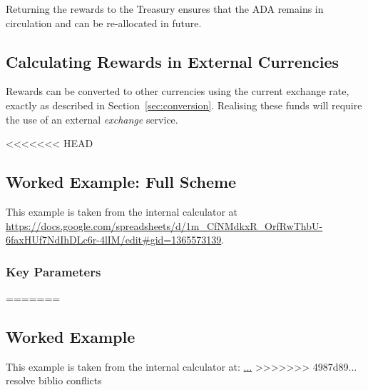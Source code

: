 \documentclass[11pt,a4paper,dvipsnames,twosided,final]{article}
\newcommand{\ada}{ADA{}}
\begin{document}
\noindent
Returning the rewards to the Treasury ensures that the \ada{} remains in circulation and can be re-allocated in future.



\subsection{Calculating Rewards in External Currencies}

Rewards can be converted to other currencies using the current exchange rate, exactly as described in
Section~\ref{sec:conversion}.  Realising these funds will require the use of an external \emph{exchange} service.

\clearpage
<<<<<<< HEAD
\subsection{Worked Example: Full Scheme}

This example is taken from the \IOHK{} internal calculator at
\url{https://docs.google.com/spreadsheets/d/1m_CfNMdkxR_OrfRwThbU-6faxHUf7NdIhDLc6r-4lIM/edit#gid=1365573139}.

\subsubsection*{Key Parameters}
=======
\subsection{Worked Example}

This example is taken from the \IOHK{} internal calculator at:
\url{...}
>>>>>>> 4987d89... resolve biblio conflicts
\end{document}
